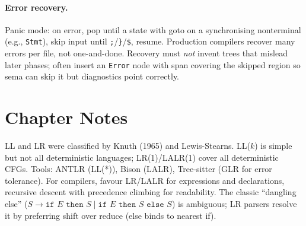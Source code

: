 \paragraph{Error recovery.} Panic mode: on error, pop until a state with goto on a synchronising nonterminal (e.g., \texttt{Stmt}), skip input until \texttt{;}/\texttt{\}}/\texttt{\$}, resume. Production compilers recover many errors per file, not one-and-done. Recovery must \emph{not} invent trees that mislead later phases; often insert an \texttt{Error} node with span covering the skipped region so sema can skip it but diagnostics point correctly.

\section{Chapter Notes}
LL and LR were classified by Knuth (1965) and Lewis-Stearns. LL($k$) is simple but not all deterministic languages; LR(1)/LALR(1) cover all deterministic CFGs. Tools: ANTLR (LL(*)), Bison (LALR), Tree-sitter (GLR for error tolerance). For compilers, favour LR/LALR for expressions and declarations, recursive descent with precedence climbing for readability. The classic ``dangling else'' ($S\to \texttt{if }E\texttt{ then }S\mid\texttt{if }E\texttt{ then }S\texttt{ else }S$) is ambiguous; LR parsers resolve it by preferring shift over reduce (else binds to nearest if).

